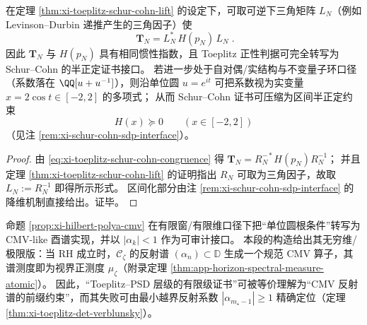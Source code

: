 \begin{proposition}\label{prop:xi-toeplitz-interval-audit-invariant-ring}
在定理 \ref{thm:xi-toeplitz-schur-cohn-lift} 的设定下，可取可逆下三角矩阵 \(L_N\)（例如 Levinson--Durbin 递推产生的三角因子）使
\[
\boxed{\;
\mathbf{T}_N=L_N^{\ast}\,H(p_N)\,L_N\; }.
\]
因此 \(\mathbf{T}_N\) 与 \(H(p_N)\) 具有相同惯性指数，且 Toeplitz 正性判据可完全转写为 Schur--Cohn 的半正定证书接口。
若进一步处于自对偶/实结构与不变量子环口径（系数落在 \(\QQ[u+u^{-1}]\)），则沿单位圆 \(u=e^{it}\) 可把系数视为实变量 \(x=2\cos t\in[-2,2]\) 的多项式；
从而 Schur--Cohn 证书可压缩为区间半正定约束
\[
H(x)\succeq 0\qquad(x\in[-2,2])
\]
（见注 \ref{rem:xi-schur-cohn-sdp-interface}）。
\end{proposition}
\begin{proof}
由 \eqref{eq:xi-toeplitz-schur-cohn-congruence} 得
\(
\mathbf{T}_N=R_N^{-*}H(p_N)R_N^{-1}
\)；
并且定理 \ref{thm:xi-toeplitz-schur-cohn-lift} 的证明指出 \(R_N\) 可取为三角因子，故取 \(L_N:=R_N^{-1}\) 即得所示形式。
区间化部分由注 \ref{rem:xi-schur-cohn-sdp-interface} 的降维机制直接给出。证毕。
\end{proof}



\begin{remark}\label{rem:xi-verblunsky-cmv-align-finite}
命题 \ref{prop:xi-hilbert-polya-cmv} 在有限窗/有限维口径下把“单位圆根条件”转写为 CMV-like 酉谱实现，并以 \(|\alpha_k|<1\) 作为可审计接口。
本段的构造给出其无穷维/极限版：当 RH 成立时，\(\mathscr{C}_\zeta\) 的反射谱 \((\alpha_n)\subset\mathbb{D}\) 生成一个规范 CMV 算子，其谱测度即为视界正测度 \(\mu_\zeta\)（附录定理 \ref{thm:app-horizon-spectral-measure-atomic}）。
因此，“Toeplitz--PSD 层级的有限级证书”可被等价理解为“CMV 反射谱的前缀约束”，而其失败可由最小越界反射系数 \(|\alpha_{m_\star-1}|\ge 1\) 精确定位（定理 \ref{thm:xi-toeplitz-det-verblunsky}）。
\end{remark}

\endinput
